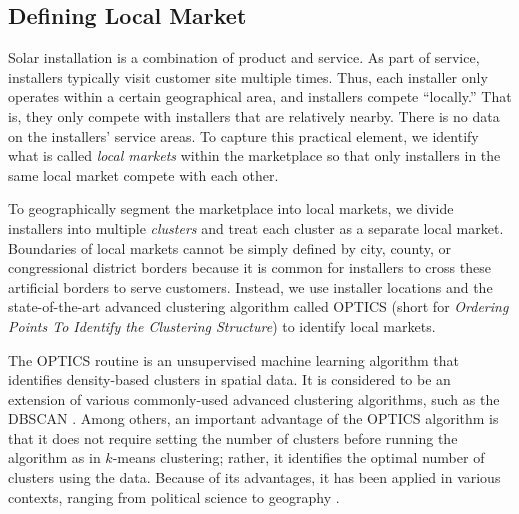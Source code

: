 \documentclass[msom,blindrev]{informs3}
\begin{document}
	
	\subsection{Defining Local Market}
	\label{defining_local_market}
	
	
	Solar installation is a combination of product and service. As part of service, installers typically visit customer site multiple times. Thus, each installer only operates  within a certain geographical area, and installers compete ``locally.'' That is, they only compete with installers that are relatively nearby. There is no data on the installers' service areas. To capture this practical element, we identify what is called \emph{local markets} within the marketplace so that only installers in the same local market compete with each other.
	
	To geographically segment the marketplace into local markets, we divide installers into multiple \emph{clusters} and treat each cluster as a separate local market. Boundaries of local markets cannot be simply defined by city, county, or congressional district borders because it is common for installers to cross these artificial borders to serve customers. Instead, we use installer locations and the state-of-the-art advanced clustering algorithm called OPTICS (short for \textit{Ordering Points To Identify the Clustering Structure}) to identify local markets.
	
	The OPTICS routine is an unsupervised machine learning algorithm that identifies density-based clusters in spatial data. It is considered to be an extension of various commonly-used advanced clustering algorithms, such as the DBSCAN \citep{kanagala2016comparative}. Among others, an important advantage of the OPTICS algorithm is that it does not require setting the number of clusters before running the algorithm as in $k$-means clustering; rather, it identifies the optimal number of clusters using the data. Because of its advantages, it has been applied in various contexts, ranging from political science \citep{davidson2019neighborhood} to geography \citep{teimouri2016method}.
	
	
\end{document}
